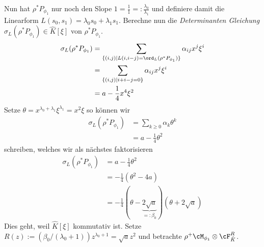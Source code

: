 \begin{comment}
Ab hier nochmal neu / verbessern!\\
wechselt variable t |-> x
\end{comment}
Nun hat $\rho^*P_{\phi_1}$ nur noch den Slope
$1=\frac{1}{1}=:\frac{\lambda_0}{\lambda_1}$ und definiere damit die Linearform
$L(s_0,s_1)=\lambda_0s_0+\lambda_1s_1$.  Berechne nun die \emph{Determinanten
Gleichung} $\sigma_L(\rho^*P_{\phi_1})\in \hat
K[\xi]$ von $\rho^*P_{\phi_1}$.
\begin{align*}
\sigma_L(\rho^*P_{\phi_1})
&= \sum_{\{(i,j) \mid L(i,i-j)=\ord_L(\rho^*P_{\phi_1})\}}\alpha_{ij}x^j\xi^i\\
&= \sum_{\{(i,j) \mid i + i-j=0\}}\alpha_{ij}x^j\xi^i\\
&= a-\frac{1}{4}x^4\xi^2
\end{align*}
Setze $\theta=x^{\lambda_0+\lambda_1}\xi^{\lambda_1}=x^2\xi$ so können wir
\begin{align*}
\sigma_L(\rho^*P_{\phi_1}) &= \sum_{k\geq 0}\alpha_k\theta^k\\
&= a-\frac{1}{4}\theta^2
\end{align*}
schreiben, welches wir als nächstes faktorisieren
\begin{align*}
\sigma_L(\rho^*P_{\phi_1}) &= a-\frac{1}{4}\theta^2\\
&=-\frac{1}{4}(\theta^2-4a)\\
&=-\frac{1}{4}
  (\theta-\underset{=:\beta_0}{\underbrace{2\sqrt{a}}})(\theta+2\sqrt{a})
\end{align*}
Dies geht, weil $\hat K[\xi]$ kommutativ ist.
Setze $R(z):=(\beta_0/(\lambda_0+1))z^{\lambda_0+1}=\sqrt{a}z^2$ und betrachte
$\rho^+\cM_{\phi_1}\otimes\cF_{\hat K}^R$.

